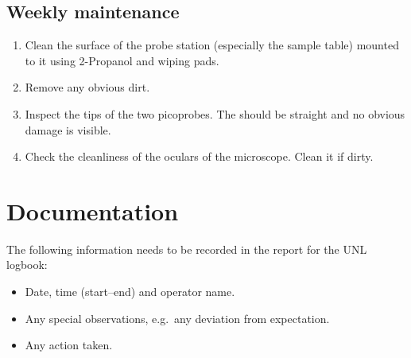 \documentclass[12pt]{unlsilabsop}
\begin{document}
\subsection{Weekly maintenance}
\begin{enumerate}
    \item Clean the surface of the probe station (especially the sample table) mounted to it using 2-Propanol and wiping pads.
    \item Remove any obvious dirt. 
    \item Inspect the tips of the two picoprobes. The should be straight and no obvious damage is visible.
    \item Check the cleanliness of the oculars of the microscope. Clean it if dirty.
\end{enumerate}

\section{Documentation}
The following information needs to be recorded in the report for the UNL logbook:
\begin{itemize}
    \item Date, time (start--end) and operator name.
    \item Any special observations, e.g.~any deviation from expectation.
    \item Any action taken.
\end{itemize}
\end{document}
